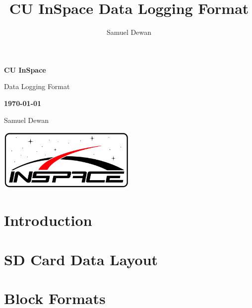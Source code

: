 \documentclass[11pt,letterpaper]{article}
\title{CU InSpace Data Logging Format}
\author{Samuel Dewan}
\begin{document}
\frenchspacing

\begin{titlepage}
\centering

{\large \textbf{CU InSpace}}

{\Huge \sffamily Data Logging Format}

{\large \textbf{\today}}

Samuel Dewan

\includegraphics[width=0.5\textwidth]{logo.png}

\end{titlepage}

\tableofcontents
\clearpage
{}

\section{Introduction}
\label{sec:introduction}

\clearpage

\section{SD Card Data Layout}
\label{sec:sd-data-layout}

\clearpage

\section{Block Formats}
\label{sec:block-formats}

\clearpage
\end{document}
